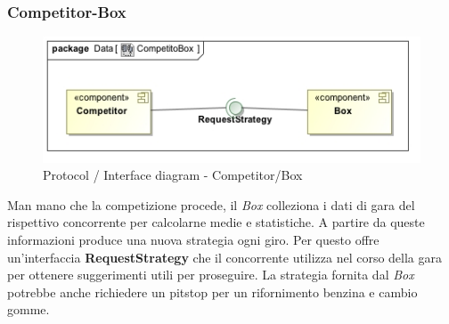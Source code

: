 \subsubsection{Competitor-Box}
\begin{center}
\begin{figure}[h!]
	\includegraphics[scale=0.55]{img/InteractionDiagram/Implementation_Diagram__CompetitoBox.jpg}
\caption{Protocol / Interface diagram - Competitor/Box}
\end{figure}
\end{center}
Man mano che la competizione procede, il \emph{Box} colleziona i dati di gara del rispettivo concorrente per calcolarne medie e statistiche. 
A partire da queste informazioni produce una nuova strategia ogni giro. Per questo offre un'interfaccia \textbf{RequestStrategy} che il concorrente
utilizza nel corso della gara per ottenere suggerimenti utili per proseguire. La strategia fornita dal \emph{Box} potrebbe anche richiedere 
un pitstop per un rifornimento benzina e cambio gomme.
